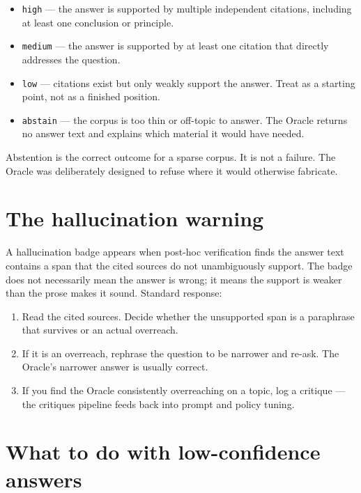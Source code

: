 \documentclass[11pt]{article}
\begin{document}
\begin{itemize}[leftmargin=*,itemsep=0.2em]
  \item \texttt{high} --- the answer is supported by multiple
        independent citations, including at least one conclusion or
        principle.
  \item \texttt{medium} --- the answer is supported by at least one
        citation that directly addresses the question.
  \item \texttt{low} --- citations exist but only weakly support the
        answer. Treat as a starting point, not as a finished
        position.
  \item \texttt{abstain} --- the corpus is too thin or off-topic to
        answer. The Oracle returns no answer text and explains which
        material it would have needed.
\end{itemize}

Abstention is the correct outcome for a sparse corpus. It is not a
failure. The Oracle was deliberately designed to refuse where it
would otherwise fabricate.

\section{The hallucination warning}

A hallucination badge appears when post-hoc verification finds the
answer text contains a span that the cited sources do not
unambiguously support. The badge does not necessarily mean the answer
is wrong; it means the support is weaker than the prose makes it
sound. Standard response:

\begin{enumerate}[leftmargin=*,itemsep=0.2em]
  \item Read the cited sources. Decide whether the unsupported span
        is a paraphrase that survives or an actual overreach.
  \item If it is an overreach, rephrase the question to be narrower
        and re-ask. The Oracle's narrower answer is usually correct.
  \item If you find the Oracle consistently overreaching on a topic,
        log a critique --- the critiques pipeline feeds back into
        prompt and policy tuning.
\end{enumerate}

\section{What to do with low-confidence answers}
\end{document}
